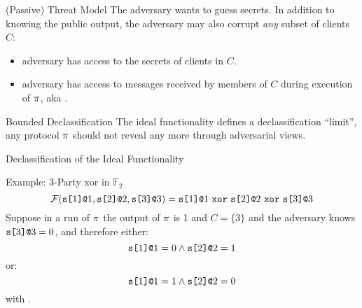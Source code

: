 \documentclass{beamer}
\begin{document}
\begin{frame}{(Passive) Threat Model}
  The adversary wants to guess secrets. In addition to knowing the public
  output, the adversary may also corrupt \emph{any} subset of clients $C$:
  \begin{itemize}
  \item adversary has access to the secrets of clients in $C$.
  \item adversary has access to messages received by members of $C$ during execution of $\pi$,
    aka .
  \end{itemize}

  \begin{alertblock}{Bounded Declassification}
    The ideal functionality defines a declassification ``limit'', any protocol $\pi$
    should not reveal any more through adversarial views.
  \end{alertblock}
\end{frame}

\begin{frame}{Declassification of the Ideal Functionality}

  \begin{exampleblock}{Example: 3-Party xor in $\mathbb{F}_2$}
  $$
  \mathcal{F}(\texttt{s[}1\texttt{]}\texttt{@}1,\texttt{s[}2\texttt{]}\texttt{@}2,\texttt{s[}3\texttt{]}\texttt{@}3) =
  \texttt{s[}1\texttt{]}\texttt{@}1\ \texttt{xor}\ \texttt{s[}2\texttt{]}\texttt{@}2\ \texttt{xor}\ \texttt{s[}3\texttt{]}\texttt{@}3
  $$
  Suppose in a run of $\pi$ the output of $\pi$ is 1 and $C = \{ 3 \}$ and
  the adversary knows $\texttt{s[}3\texttt{]}\texttt{@}3 = 0$, and therefore either:
  $$
  \texttt{s[}1\texttt{]}\texttt{@}1 = 0 \wedge \texttt{s[}2\texttt{]}\texttt{@}2 = 1
  $$
  or:
  $$
  \texttt{s[}1\texttt{]}\texttt{@}1 = 1 \wedge \texttt{s[}2\texttt{]}\texttt{@}2 = 0
  $$
  with . 
  \end{exampleblock}
  
\end{frame}
\end{document}
